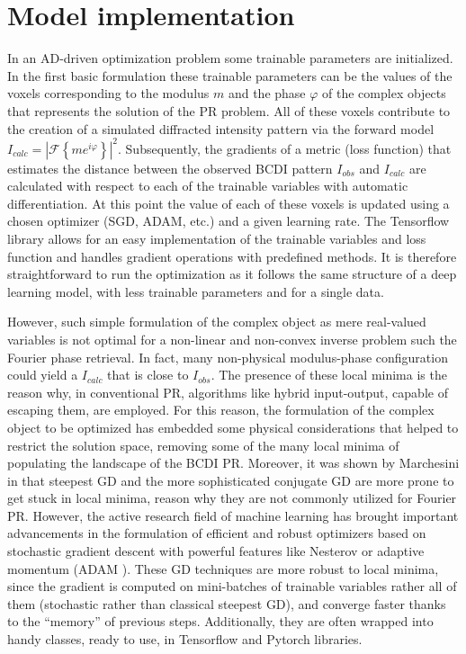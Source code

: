 \section{Model implementation}
In an AD-driven optimization problem some trainable parameters are initialized. In the first basic formulation these 
trainable parameters can be the values of the voxels corresponding to the modulus $m$ and the phase $\varphi$ of the complex objects 
that represents the solution of the PR problem. All of these voxels contribute to the creation of a simulated 
diffracted intensity pattern via the forward model $I_{calc} = |\mathcal{F}\left\{ me^{i\varphi} \right\}|^2$. Subsequently, 
the gradients of a metric (loss function) that estimates the distance between the observed BCDI pattern $I_{obs}$ and $I_{calc}$ are calculated 
with respect to each of the trainable variables with automatic differentiation. At this point the value of each of these voxels is 
updated using a chosen optimizer (SGD, ADAM, etc.) and a given learning rate. The Tensorflow library allows for an easy 
implementation of the trainable variables and loss function and handles gradient operations with predefined methods. It is therefore 
straightforward to run the optimization as it follows the same structure of a deep learning model, with less trainable parameters and 
for a single data. 

However, such simple formulation of the complex object as mere real-valued variables is not optimal for a non-linear and non-convex 
inverse problem such the Fourier phase retrieval. In fact, many non-physical modulus-phase configuration could yield a 
$I_{calc}$ that is close to  $I_{obs}$. The presence of these local minima is the reason why, in conventional PR, algorithms 
like hybrid input-output, capable of escaping them, are employed. 
For this reason, the formulation of the complex object to be optimized has embedded some physical considerations that 
helped to restrict the solution space, removing some of the many local minima of populating the landscape of the BCDI PR. 
Moreover, it was shown by Marchesini in \cite{marchesini_unified_2007}
that steepest GD and the more sophisticated conjugate GD are more prone to get stuck in local 
minima, reason why they are not commonly utilized for Fourier PR. However, the active research field of machine learning has 
brought important advancements in the formulation of efficient and robust optimizers based on stochastic gradient descent with 
powerful features like Nesterov or adaptive momentum (ADAM \cite{ADAM}). These GD techniques are more robust to local minima, 
since the gradient is computed on mini-batches of trainable variables rather all of them (stochastic rather than classical steepest GD), 
and converge faster thanks to the ``memory'' of previous steps. Additionally, they are often wrapped into handy classes, ready to use, 
in Tensorflow and Pytorch libraries.  

